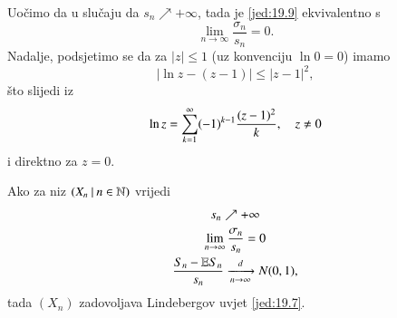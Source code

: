 Uo\v cimo da u slu\v caju da $s_n \nearrow +\infty$, tada je \eqref{jed:19.9} ekvivalentno s
\begin{equation}    \label{jed:19.10}
    \lim\limits_{n \to \infty} \frac{\sigma_n}{s_n} = 0.
\end{equation}
Nadalje, podsjetimo se da za $|z| \leq 1$ (uz konvenciju $\ln 0 = 0$) imamo
\begin{equation}    \label{jed:19.11}
    | \ln z - (z - 1) | \leq |z - 1|^2,
\end{equation}
\v sto slijedi iz
\begin{equation*}
    \ln z = \sum\limits_{k = 1}^{\infty} (-1)^{k-1} \frac{(z - 1)^2}{k}, \quad z \neq 0
\end{equation*}
i direktno za $z = 0$.

\begin{tm}  \label{tm:19.12}
    Ako za niz $({X_n} \: | \: {n \in \mathbb{N}})$ vrijedi
    \begin{equation*}
        \begin{gathered}
            s_n \nearrow +\infty\\
            \lim\limits_{n \to \infty} \frac{\sigma_n}{s_n} = 0\\
            \frac{S_n - \mathbb{E} S_n}{s_n} \xrightarrow[n \to \infty]{d} N(0,1),
        \end{gathered}
    \end{equation*}
    tada $(X_n)$ zadovoljava Lindebergov uvjet \eqref{jed:19.7}.
\end{tm}

